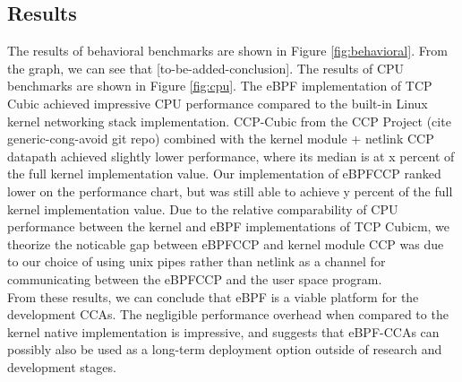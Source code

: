 \documentclass[../main.tex]{subfiles}
\begin{document}
\subsection{Results}
The results of behavioral benchmarks are shown in Figure \ref{fig:behavioral}. From the graph, we can see that [to-be-added-conclusion]. The results of CPU benchmarks are shown in Figure \ref{fig:cpu}. The eBPF implementation of TCP Cubic achieved impressive CPU performance compared to the built-in Linux kernel networking stack implementation. CCP-Cubic from the CCP Project (cite generic-cong-avoid git repo) combined with the kernel module + netlink CCP datapath achieved slightly lower performance, where its median is at x percent of the full kernel implementation value. Our implementation of eBPFCCP ranked lower on the performance chart, but was still able to achieve y percent of the full kernel implementation value. Due to the relative comparability of CPU performance between the kernel and eBPF implementations of TCP Cubicm, we theorize the noticable gap between eBPFCCP and kernel module CCP was due to our choice of using unix pipes rather than netlink as a channel for communicating between the eBPFCCP and the user space program. \\
From these results, we can conclude that eBPF is a viable platform for the development CCAs. The negligible performance overhead when compared to the kernel native implementation is impressive, and suggests that eBPF-CCAs can possibly also be used as a long-term deployment option outside of research and development stages. 
\end{document}
